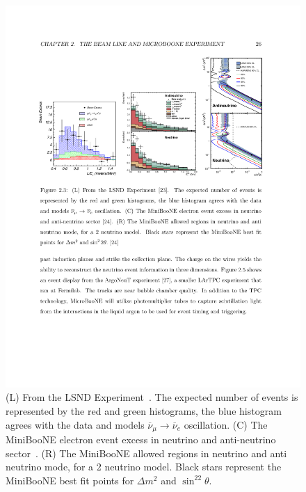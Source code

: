 \documentclass[aps,prd,twocolumn,nofootinbib]{revtex4-1}
\begin{document}
\begin{figure}
  \centering
  \includegraphics[width=1\textwidth]{../figures/lsnd_miniboone.pdf}
  \caption{(L) From the LSND Experiment~\cite{LSND}. The expected number of events is represented by the red and green histograms, the blue histogram agrees with the data and models $\overline{\nu}_{\mu}\rightarrow \overline{\nu}_e$ oscillation. (C) The MiniBooNE electron event excess in neutrino and anti-neutrino sector~\cite{mini2}. (R) The MiniBooNE allowed regions in neutrino and anti neutrino mode, for a 2 neutrino model. Black stars represent the MiniBooNE best fit points for $\Delta m^2$ and $\sin^22\theta$.~\cite{mini2}}
  \label{fig:lsnd_miniboone}
\end{figure}
\end{document}
